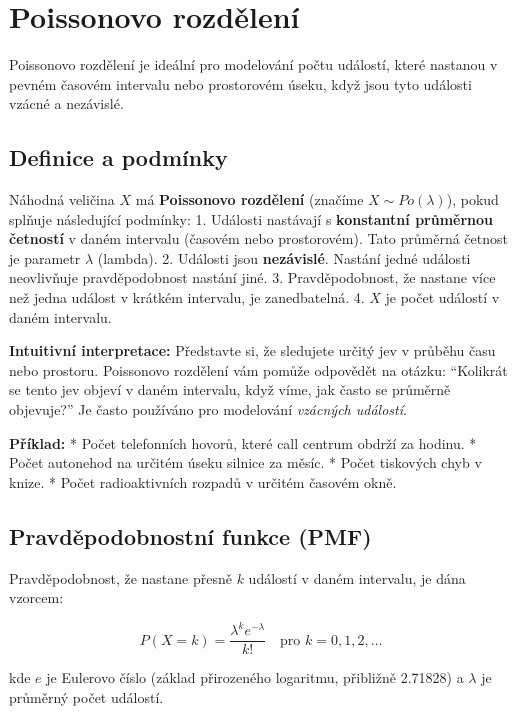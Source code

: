 \documentclass[
  czech,
  11pt,
  letterpaper,
  DIV=11,
  numbers=noendperiod]{scrreprt}
\begin{document}
\section{Poissonovo rozdělení}\label{poissonovo-rozdux11blenuxed}

Poissonovo rozdělení je ideální pro modelování počtu událostí, které
nastanou v pevném časovém intervalu nebo prostorovém úseku, když jsou
tyto události vzácné a nezávislé.

\subsection{Definice a podmínky}\label{definice-a-podmuxednky-1}

Náhodná veličina \(X\) má {\textbf{Poissonovo rozdělení}} (značíme
\(X \sim Po(\lambda)\)), pokud splňuje následující podmínky: 1. Události
nastávají s \textbf{konstantní průměrnou četností} v daném intervalu
(časovém nebo prostorovém). Tato průměrná četnost je parametr
\(\lambda\) (lambda). 2. Události jsou \textbf{nezávislé}. Nastání jedné
události neovlivňuje pravděpodobnost nastání jiné. 3. Pravděpodobnost,
že nastane více než jedna událost v krátkém intervalu, je zanedbatelná.
4. \(X\) je počet událostí v daném intervalu.

\textbf{Intuitivní interpretace:} Představte si, že sledujete určitý jev
v průběhu času nebo prostoru. Poissonovo rozdělení vám pomůže odpovědět
na otázku: ``Kolikrát se tento jev objeví v daném intervalu, když víme,
jak často se průměrně objevuje?'' Je často používáno pro modelování
\emph{vzácných událostí}.

\textbf{Příklad:} * Počet telefonních hovorů, které call centrum obdrží
za hodinu. * Počet autonehod na určitém úseku silnice za měsíc. * Počet
tiskových chyb v knize. * Počet radioaktivních rozpadů v určitém časovém
okně.

\subsection{Pravděpodobnostní funkce
(PMF)}\label{pravdux11bpodobnostnuxed-funkce-pmf-2}

Pravděpodobnost, že nastane přesně \(k\) událostí v daném intervalu, je
dána vzorcem:

\[ P(X=k) = \frac{\lambda^k e^{-\lambda}}{k!} \quad \text{pro } k=0, 1, 2, \dots \]

kde \(e\) je Eulerovo číslo (základ přirozeného logaritmu, přibližně
2.71828) a \(\lambda\) je průměrný počet událostí.
\end{document}

